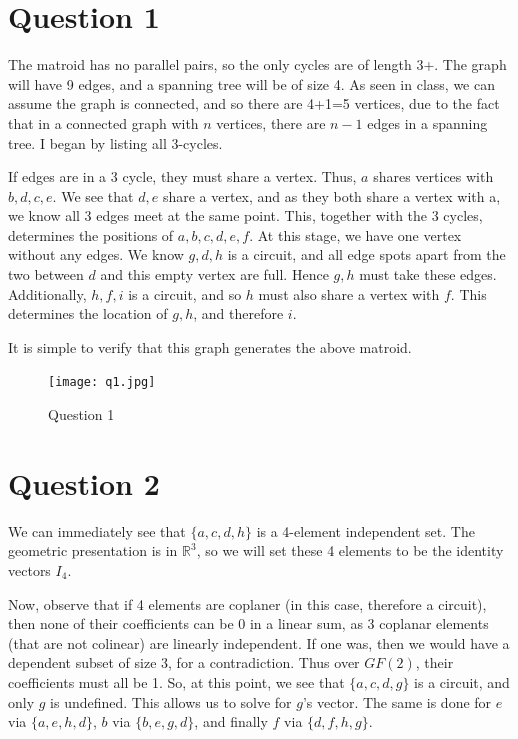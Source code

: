 \documentclass{article}
\begin{document}
\section*{Question 1}
The matroid has no parallel pairs, so the only cycles are of length 3+. The graph will have 
9 edges, and  a spanning tree will be of size 4. As seen in class, we can assume the graph is connected, and so there are 4+1=5 vertices,
due to the fact that in a connected graph with $n$ vertices, there are $n-1$ edges in a spanning tree.
I began by listing all 3-cycles.

If edges are in a 3 cycle, they must share a vertex. Thus, $a$ shares vertices with $b, d, c, e$. We see that $d, e$ share a vertex, and as they both 
share a vertex with a, we know all 3 edges meet at the same point. This, together with the 3 cycles, determines the positions of $a, b, c, d, e, f$.
At this stage, we have one vertex without any edges. We know $g, d, h$ is a circuit, and all edge spots apart from the two between $d$ and this empty 
vertex are full. Hence $g, h$ must take these edges. Additionally, $h, f, i$ is a circuit, and so $h$ must also share a vertex with $f$. This determines 
the location of $g, h$, and therefore $i$. 

It is simple to verify that this graph generates the above matroid.

    \begin{figure}[!htb]
        \centering
        \texttt{[image: q1.jpg]}
        \caption{Question 1}
    \end{figure}

\section*{Question 2}
We can immediately see that $\{a, c, d, h\}$ is a 4-element independent set. The geometric presentation is in $\mathbb{R}^3$, so 
we will set these 4 elements to be the identity vectors $I_4$.

Now, observe that if 4 elements are coplaner (in this case, therefore a circuit), then none of their coefficients can be 0 in a linear sum,
as 3 coplanar elements (that are not colinear) are linearly independent.
If one was, then we would have a dependent subset of size 3, for a contradiction. Thus over $GF(2)$, their coefficients must all be 1.
So, at this point, we see that $\{a, c, d, g\}$ is a circuit, and only $g$ is undefined. This allows us to solve for $g$'s vector.
The same is done for $e$ via $\{a, e, h, d\}$, $b$ via $\{b, e, g, d\}$, and finally $f$ via $\{d, f, h, g\}$.
\end{document}
